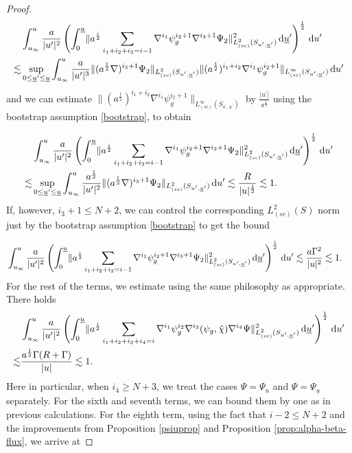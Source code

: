 \documentclass{amsart}
\newcommand{\ali}{a^{\frac{i}{2}}}
\newcommand{\dubarprime}{\hspace{.5mm} \text{d} \ubar^{\prime}}
\newcommand{\intu}{\int_{u_{\infty}}^u}
\newcommand{\intubar}{\int_0^{\ubar}}
\newcommand{\chihat}{\hat{\chi}}
\newcommand{\upr}{\lvert u^\prime \rvert}
\newcommand{\al}{a^{\frac{1}{2}}}
\newcommand{\ubar}{\underline{u}}
\newcommand{\sumitm}{\sum_{i_1+i_2+i_3=i-1}}
\newcommand{\sumif}{\sum_{i_1+i_2+i_3+i_4=i}}
\newcommand{\scaleinfinitySuprimeubarprime}[1]{\lVert{#1} \rVert_{L^\infty_{(sc)}(S_{u^{\prime},\ubar^\prime})}}
\newcommand{\nablap}{\nabla^{i_1}\psi_g^{i_2}}
\newcommand{\nablapp}{\nabla^{i_1}\psi_g^{i_2+1}}
\newcommand{\scaletwoSuprimeubarprime}[1]{\lVert{#1} \rVert_{L^2_{(sc)}(S_{u^\prime,\ubar^\prime})}}
\newcommand{\duprime}{\hspace{.5mm} \text{d}u^{\prime}}
\newcommand{\nablaf}{\nabla^{i_4}}
\begin{document}
{\begin{proof}
\begin{equation}
    \begin{split}
        &\intu \frac{a}{\upr^2} \left( \intubar \scaletwoSuprimeubarprime{\ali \sumitm \nablapp \nabla^{i_3+1}\Psi_2 }^2 \dubarprime \right)^{\frac{1}{2}} \duprime \\ \lesssim & \sup_{0 \leq \ubar^{\prime}\leq \ubar} \intu \frac{a}{\upr^3} \scaletwoSuprimeubarprime{     (\al \nabla)^{i_3+1} \Psi_2} \scaleinfinitySuprimeubarprime{(\al)^{i_1+i_2}\nablapp}  \duprime   
    \end{split}
\end{equation}and we can estimate $\scaleinfinitySuprimeubarprime{(\al)^{i_1+i_2}\nablapp} $ by $\frac{\upr}{\al}$ using the bootstrap assumption \eqref{bootstrap}, to obtain

\begin{equation}
    \begin{split}
         &\intu \frac{a}{\upr^2} \left( \intubar \scaletwoSuprimeubarprime{\ali \sumitm \nablapp \nabla^{i_3+1}\Psi_2 }^2 \dubarprime \right)^{\frac{1}{2}} \duprime \\ \lesssim & \sup_{0 \leq \ubar^{\prime}\leq \ubar}\intu \frac{\al}{\upr^2}\scaletwoSuprimeubarprime{     (\al \nabla)^{i_3+1} \Psi_2}  \duprime \lesssim \frac{R}{\lvert u \rvert^{\frac{1}{2}}}\lesssim 1. 
    \end{split}
\end{equation}If, however, $i_3+1 \leq N+2$, we can control the corresponding $L^2_{(sc)}(S)$ norm just by the bootstrap assumption \eqref{bootstrap} to get the bound 

\begin{equation}
    \begin{split}
         &\intu \frac{a}{\upr^2} \left( \intubar \scaletwoSuprimeubarprime{\ali \sumitm \nablapp \nabla^{i_3+1}\Psi_2 }^2 \dubarprime \right)^{\frac{1}{2}} \duprime \lesssim \frac{a \Gamma^2}{\lvert u \rvert^2} \lesssim 1.
         \end{split}
\end{equation}For the rest of the terms, we estimate using the same philosophy as appropriate. There holds  
\begin{equation}
    \begin{split}
        &\intu \frac{a}{\upr^2} \left( \intubar \scaletwoSuprimeubarprime{\ali \sumif \nablap \nabla^{i_3}(\psi_g,\chihat) \nablaf\Psi }^2 \dubarprime \right)^{\frac{1}{2}} \duprime \\ \lesssim & \frac{\al \Gamma (R+\Gamma)}{\lvert u \rvert}\lesssim 1.
    \end{split}
\end{equation}Here in particular, when $i_4\geq N+3$, we treat the cases $\Psi=\Psi_u$ and $\Psi= \Psi_{\ubar}$ separately. 
For the sixth and seventh terms, we can bound them by one as in previous calculations. For the eighth term, using the fact that $i-2 \leq N+2$ and the improvements from Proposition \ref{psiuprop}  and Proposition \ref{prop:alpha-beta-flux}, we arrive at


\end{proof}}
\end{document}
